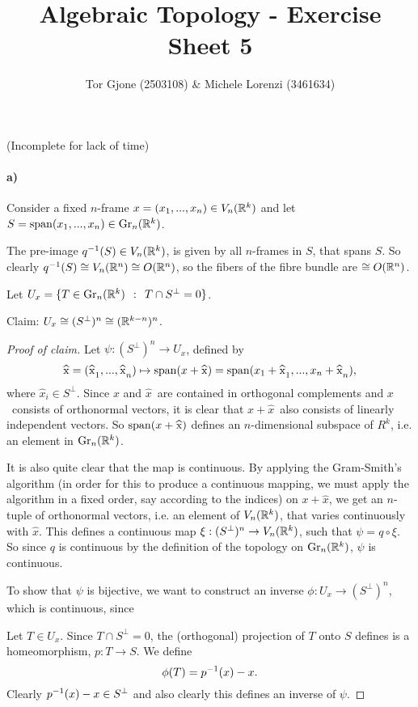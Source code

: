 \documentclass[a4paper,11pt,english]{article}
\title{\textbf{Algebraic Topology} - Exercise Sheet 5}
\author{Tor Gjone (2503108) \& Michele Lorenzi (3461634)}
\newcommand{\orth}{\bot}
\begin{document}
\mmaketitle

\begin{exercise}[1] (Incomplete for lack of time)

\paragraph{a)}
Consider a fixed $n$-frame $x = (x_1, ..., x_n) \in V_n(\mathbb{R}^k)$ and let 
$S = \operatorname{span}(x_1,...,x_n) \in \operatorname{Gr}_n(\mathbb{R}^k)$. 

The pre-image $q^{-1}(S) \in V_n(\mathbb{R}^k)$, is given by all $n$-frames in $S$, that
spans $S$. So clearly $q^{-1}(S) \cong V_n(\mathbb{R}^n) \cong O(\mathbb{R}^n)$, so the fibers of the
fibre bundle are $\cong O(\mathbb{R}^n)$.

Let $U_x = \{ T \in \Gr_n(\R^k) \q: T \cap S^{\orth} = 0 \}$. 

Claim: $U_x \cong (S^\orth)^n \cong (\R^{k-n})^n$.
\begin{proof}[Proof of claim]
Let $\psi: (S^\orth)^n \to U_x$, defined by
\[ \hat x = (\hat x_1, ..., \hat x_n) \mapsto \span(x+\hat x) = \span(x_1 + \hat x_1, ..., x_n + \hat x_n
), \]
where $\hat x_i \in S^{\orth}$. Since $x$ and $\hat x$ are contained in
orthogonal complements and $x$ consists of orthonormal vectors, it is clear that
$x + \hat x$ also consists of linearly independent vectors. So $\span(x+\hat x)$
defines an $n$-dimensional subspace of $R^k$, i.e. an element in
$\operatorname{Gr}_n(\mathbb{R}^k)$. 

It is also quite clear that the map is continuous. By applying the Gram-Smith's
algorithm (in order for this to produce a continuous mapping, we must apply the
algorithm in a fixed order, say according to the indices) on $x + \hat x$, we
get an $n$-tuple of orthonormal vectors, i.e. an element of $V_n(\mathbb{R}^k)$, that
varies continuously with $\hat x$.
This defines a continuous map $\xi: (S^{\orth})^n \to V_n(\R^k)$, such that $\psi = q \circ \xi$. So since $q$ is continuous by the definition of the topology on $\operatorname{Gr}_n(\mathbb{R}^k)$, $\psi$ is continuous.

To show that $\psi$ is bijective, we want to construct an inverse $\phi: U_x \to (S^{\orth})^n$, which is continuous, since 

Let $T \in U_x$. Since $T \cap S^\orth = 0$, the (orthogonal) projection of $T$ onto
$S$ defines is a homeomorphism, $p: T \to S$. We define \[ \phi(T) = p^{-1}(x) - x. \]
Clearly $p\i(x) - x \in S^\orth$ and also clearly this defines an inverse of
$\psi$.
\end{proof}


\end{exercise}
\end{document}
